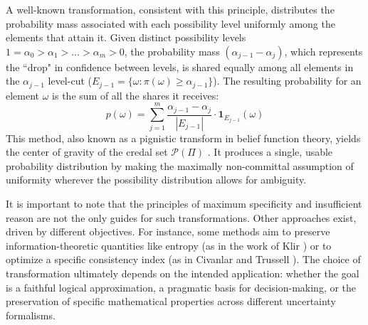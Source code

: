 A well-known transformation, consistent with this principle, distributes the probability mass associated with each possibility level uniformly among the elements that attain it. Given distinct possibility levels $1 = \alpha_0 > \alpha_1 > \dots > \alpha_m > 0$, the probability mass $(\alpha_{j-1} - \alpha_j)$, which represents the ``drop" in confidence between levels, is shared equally among all elements in the $\alpha_{j-1}$ level-cut ($E_{j-1} = \{\omega : \pi(\omega) \ge \alpha_{j-1}\}$). The resulting probability for an element $\omega$ is the sum of all the shares it receives:
\[ p(\omega) = \sum_{j=1}^{m} \frac{\alpha_{j-1} - \alpha_j}{|E_{j-1}|} \cdot \mathbf{1}_{E_{j-1}}(\omega) \]
This method, also known as a pignistic transform in belief function theory, yields the center of gravity of the credal set $\mathcal{P}(\Pi)$ \cite{Dubois1997}. It produces a single, usable probability distribution by making the maximally non-committal assumption of uniformity wherever the possibility distribution allows for ambiguity.

It is important to note that the principles of maximum specificity and insufficient reason are not the only guides for such transformations. Other approaches exist, driven by different objectives. For instance, some methods aim to preserve information-theoretic quantities like entropy (as in the work of Klir \cite{Klir1990}) or to optimize a specific consistency index (as in Civanlar and Trussell \cite{Civanlar1986}). The choice of transformation ultimately depends on the intended application: whether the goal is a faithful logical approximation, a pragmatic basis for decision-making, or the preservation of specific mathematical properties across different uncertainty formalisms.